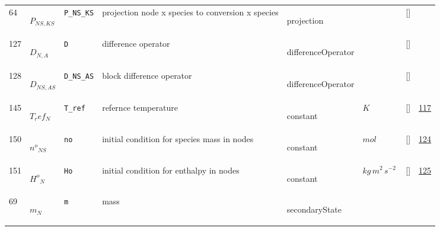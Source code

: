 \begin{longtable}{|p{1cm}|p{3cm}|p{3cm}|p{7cm}|p{3.0cm}|p{3cm}|p{2cm}|p{1cm}|}
    64
             & \hypertarget{"v:64"}{ $ {P}{_{{N S}, {K S}}} $}
             & \verb|P_NS_KS|
             & projection node x species to conversion x species
             & \begin{lay}projection \end{lay}
             & $  $
             & []
             & \\
    127
             & \hypertarget{"v:127"}{ $ {D}{_{N, A}} $}
             & \verb|D|
             & difference operator
             & \begin{lay}differenceOperator \end{lay}
             & $  $
             & []
             & \\
    128
             & \hypertarget{"v:128"}{ $ {D}{_{{N S}, {A S}}} $}
             & \verb|D_NS_AS|
             & block difference operator
             & \begin{lay}differenceOperator \end{lay}
             & $  $
             & []
             & \\
    145
             & \hypertarget{"v:145"}{ $ {T_ref}{_{N}} $}
             & \verb|T_ref|
             & refernce temperature
             & \begin{lay}constant \end{lay}
             & $ K \, $
             & []
             & \hyperlink{"e:117"}{ 117 }
                 \\
    150
             & \hypertarget{"v:150"}{ $ {{n^o}}{_{{N S}}} $}
             & \verb|no|
             & initial condition for species mass in nodes
             & \begin{lay}constant \end{lay}
             & $ mol \, $
             & []
             & \hyperlink{"e:124"}{ 124 }
                 \\
    151
             & \hypertarget{"v:151"}{ $ {{H^o}}{_{N}} $}
             & \verb|Ho|
             & initial condition for enthalpy in nodes
             & \begin{lay}constant \end{lay}
             & $ kg \,m^{2} \,s^{-2} \, $
             & []
             & \hyperlink{"e:125"}{ 125 }
                 \\
    69
             & \hypertarget{"v:69"}{ $ {m}{_{N}} $}
             & \verb|m|
             & mass
             & \begin{lay}secondaryState \end{lay}

\end{longtable}
